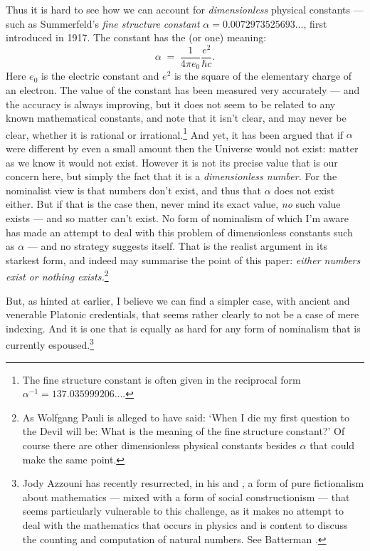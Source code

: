 \documentclass[11pt,oneside,a4paper]{article}
\begin{document}
Thus it is hard to see how we can account for \textit{dimensionless} physical constants --- such as Summerfeld's \textit{fine structure constant} $\alpha = 0.0072973525693\ldots$, first introduced in 1917. The constant has the (or one) meaning:
\[ \alpha\; =\; \frac{1}{4 \pi e_{0}} \frac{e^{2}}{\hbar c}.  \]
Here $e_{0}$ is the electric constant and $e^{2}$ is the square of the elementary charge of an electron. The value of the constant has been measured very accurately --- and the accuracy is always improving, but it does not seem to be related to any known mathematical constants, and note that it isn't clear, and may never be clear, whether it is rational or irrational.\footnote{The fine structure constant is often given in the reciprocal form $\alpha^{-1} = 137.035999206\ldots$.} And yet, it has been argued that if $\alpha$ were different by even a small amount then the Universe would not exist: matter as we know it would not exist. However it is not its precise value that is our concern here, but simply the fact that it is a \textit{dimensionless number.} For the nominalist view is that numbers don't exist, and thus that $\alpha$ does not exist either. But if that is the case then, never mind its exact value, \textit{no} such value exists --- and so matter can't exist. No form of nominalism of which I'm aware has made an attempt to deal with this problem of dimensionless constants such as $\alpha$ --- and no strategy suggests itself. That is the realist argument in its starkest form, and indeed may summarise the point of this paper: \textit{either numbers exist or nothing exists.}\footnote{As Wolfgang Pauli is alleged to have said: `When I die my first question to the Devil will be: What is the meaning of the fine structure constant?' Of course there are other dimensionless physical constants besides $\alpha$ that could make the same point.}


But, as hinted at earlier, I believe we can find a simpler case, with ancient and venerable Platonic credentials, that seems rather clearly to not be a case of mere indexing. And it is one that is equally as hard for any form of nominalism that is currently espoused.\footnote{Jody Azzouni has recently resurrected, in his \parencite*{azzouni_deflating_2006} and \parencite{azzouni_talking_2010}, a form of pure fictionalism about mathematics --- mixed with a form of social constructionism --- that seems particularly vulnerable to this challenge, as it makes no attempt to deal with the mathematics that occurs in physics and is content to discuss the counting and computation of natural numbers. See Batterman \parencite{batterman_explanatory_2010}.}
\end{document}
